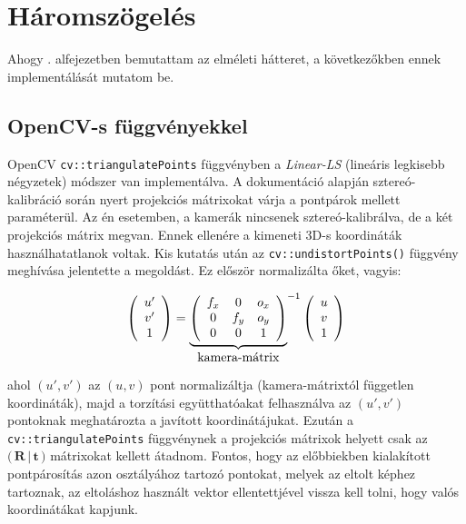\section{Háromszögelés}

Ahogy . alfejezetben bemutattam az elméleti hátteret, a következőkben ennek implementálását mutatom be.

\subsection{OpenCV-s függvényekkel}

OpenCV \texttt{cv::triangulatePoints} függvényben a \textit{Linear-LS} (lineáris legkisebb négyzetek) módszer van implementálva. A dokumentáció \cite{camera-calib-3d} alapján sztereó-kalibráció során nyert projekciós mátrixokat várja a pontpárok mellett paraméterül. Az én esetemben, a kamerák nincsenek sztereó-kalibrálva, de a két projekciós mátrix megvan. Ennek ellenére a kimeneti 3D-s koordináták használhatatlanok voltak. Kis kutatás után az \texttt{cv::undistortPoints()} függvény meghívása jelentette a megoldást. Ez először normalizálta őket, vagyis:

\[\left(\begin{array}{c} u' \\ v' \\ 1 \end{array}\right) = {\underbrace{\left(\begin{array}{ccc}
f_x & 0 & o_x \\ 
0 & f_y & o_y \\
0 & 0 & 1
\end{array}\right)}_{\hbox{kamera-mátrix}}}^{-1} \left(\begin{array}{c} u \\ v \\ 1 \end{array}\right)\]

ahol $(u', v')$ az $(u, v)$ pont normalizáltja (kamera-mátrixtól független koordináták), majd a torzítási együtthatóakat felhasználva az $(u', v')$ pontoknak meghatározta a javított koordinátájukat. Ezután a \texttt{cv::triangulatePoints} függvénynek a projekciós mátrixok helyett csak az $\Big(\,\mathbf{R}\,|\,\mathbf{t}\,\Big)$ mátrixokat kellett átadnom. Fontos, hogy az előbbiekben kialakított pontpárosítás azon osztályához tartozó pontokat, melyek az eltolt képhez tartoznak, az eltoláshoz használt vektor ellentettjével vissza kell tolni, hogy valós koordinátákat kapjunk.

